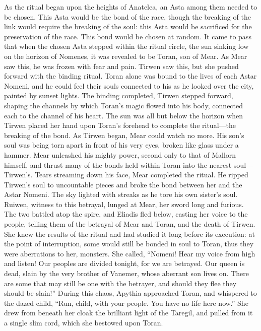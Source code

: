 \documentclass[smalldemyvopaper,11pt,twoside,onecolumn,openright,extrafontsizes]{memoir}
\begin{document}
{{As the ritual began upon the heights of Anatelea, an Asta among them needed to be chosen. This Asta would be the bond of the race, though the breaking of the link would require the breaking of the soul: this Asta would be sacrificed for the preservation of the race. This bond would be chosen at random. It came to pass that when the chosen Asta stepped within the ritual circle, the sun sinking low on the horizon of Nomenes, it was revealed to be Toran, son of Mear. As Mear saw this, he was frozen with fear and pain. Tirwen saw this, but she pushed forward with the binding ritual. Toran alone was bound to the lives of each Astar Nomeni, and he could feel their souls connected to his as he looked over the city, painted by sunset lights. The binding completed, Tirwen stepped forward, shaping the channels by which Toran’s magic flowed into his body, connected each to the channel of his heart. The sun was all but below the horizon when Tirwen placed her hand upon Toran’s forehead to complete the ritual—the breaking of the bond. As Tirwen began, Mear could watch no more. His son’s soul was being torn apart in front of his very eyes, broken like glass under a hammer. Mear unleashed his mighty power, second only to that of Mallorn himself, and thrust many of the bonds held within Toran into the nearest soul—Tirwen’s. Tears streaming down his face, Mear completed the ritual. He ripped Tirwen’s soul to uncountable pieces and broke the bond between her and the Astar Nomeni. The sky lighted with streaks as he tore his own sister’s soul.
Ruiwen, witness to this betrayal, lunged at Mear, her sword long and furious. The two battled atop the spire, and Eliadis fled below, casting her voice to the people, telling them of the betrayal of Mear and Toran, and the death of Tirwen. She knew the results of the ritual and had studied it long before its execution: at the point of interruption, some would still be bonded in soul to Toran, thus they were aberrations to her, monsters. She called,
“Nomeni! Hear my voice from high and listen! Our peoples are divided tonight, for we are betrayed. Our queen is dead, slain by the very brother of Vanemer, whose aberrant son lives on. There are some that may still be one with the betrayer, and should they flee they should be slain!”
During this chaos, Apythia approached Toran, and whispered to the dazed child,
“Run, child, with your people. You have no life here now.”
She drew from beneath her cloak the brilliant light of the Taregil, and pulled from it a single slim cord, which she bestowed upon Toran.
}}
\end{document}
